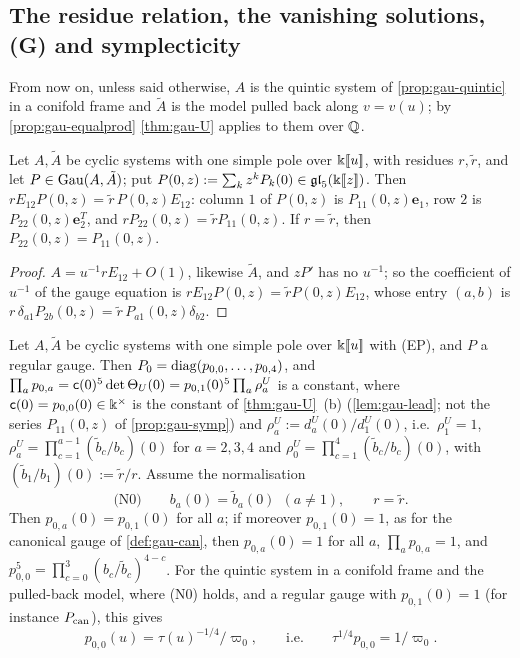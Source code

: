 
\subsection{The residue relation, the vanishing solutions, (G) and symplecticity}
\label{sec:gau-van}

From now on, unless said otherwise, $A$ is the quintic system of \cref{prop:gau-quintic} in a conifold frame and $\tilde A$ is the model pulled back along $v=v(u)$; by \cref{prop:gau-equalprod} \cref{thm:gau-U} applies to them over $\mathbb{Q}$.

\begin{lem}
\label{lem:gau-R1}
Let $A,\tilde A$ be cyclic systems with one simple pole over $\Bbbk[\![ u ]\!]$, with residues $r,\tilde r$, and let $P\in\operatorname{Gau}(A,\tilde A)$; put $P(0,z):=\sum_kz^kP_k(0)\in\mathfrak{gl}_5(\Bbbk[\![ z ]\!])$. Then $rE_{12}P(0,z)=\tilde r\,P(0,z)E_{12}$: column $1$ of $P(0,z)$ is $P_{11}(0,z)\mathbf e_1$, row $2$ is $P_{22}(0,z)\mathbf e_2^T$, and $rP_{22}(0,z)=\tilde rP_{11}(0,z)$. If $r=\tilde r$, then $P_{22}(0,z)=P_{11}(0,z)$.
\end{lem}

\begin{proof}
$A=u^{-1}rE_{12}+O(1)$, likewise $\tilde A$, and $zP'$ has no $u^{-1}$; so the coefficient of $u^{-1}$ of the gauge equation is $rE_{12}P(0,z)=\tilde rP(0,z)E_{12}$, whose entry $(a,b)$ is $r\,\delta_{a1}P_{2b}(0,z)=\tilde r\,P_{a1}(0,z)\delta_{b2}$.
\end{proof}

\begin{lem}
\label{lem:gau-diag}
Let $A,\tilde A$ be cyclic systems with one simple pole over $\Bbbk[\![ u ]\!]$ with (EP), and $P$ a regular gauge. Then $P_0=\operatorname{diag}(p_{0,0},\dots,p_{0,4})$, and $\prod_ap_{0,a}=\mathsf{c}(0)^5\det\Theta_U(0)=p_{0,1}(0)^5\prod_a\rho^U_a$ is a constant, where $\mathsf{c}(0)=p_{0,0}(0)\in\Bbbk^\times$ is the constant of \cref{thm:gau-U}~(b) (\cref{lem:gau-lead}; not the series $P_{11}(0,z)$ of \cref{prop:gau-symp}) and $\rho^U_a:=d^U_a(0)/d^U_1(0)$, i.e.\ $\rho^U_1=1$, $\rho^U_a=\prod_{c=1}^{a-1}(\tilde b_c/b_c)(0)$ for $a=2,3,4$ and $\rho^U_0=\prod_{c=1}^4(\tilde b_c/b_c)(0)$, with $(\tilde b_1/b_1)(0):=\tilde r/r$. Assume the normalisation
\[
\text{(N0)}\qquad b_a(0)=\tilde b_a(0)\ \ (a\neq1),\qquad r=\tilde r .
\]
Then $p_{0,a}(0)=p_{0,1}(0)$ for all $a$; if moreover $p_{0,1}(0)=1$, as for the canonical gauge of \cref{def:gau-can}, then $p_{0,a}(0)=1$ for all $a$, $\prod_ap_{0,a}=1$, and $p_{0,0}^5=\prod_{c=0}^3(b_c/\tilde b_c)^{4-c}$. For the quintic system in a conifold frame and the pulled-back model, where (N0) holds, and a regular gauge with $p_{0,1}(0)=1$ (for instance $P_{\mathrm{can}}$), this gives
\[
p_{0,0}(u)=\tau(u)^{-1/4}/\varpi_0,\qquad\text{i.e.}\qquad \tau^{1/4}p_{0,0}=1/\varpi_0 .
\]
\end{lem}

